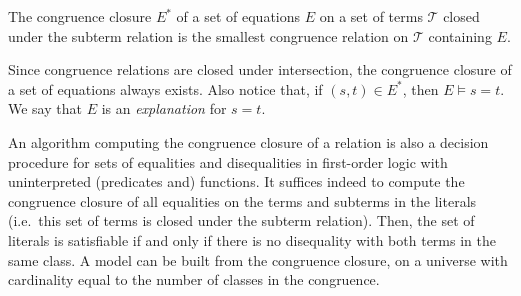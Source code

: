 \documentclass[smallextended]{svjour3}
\begin{document}
\begin{definition}
The congruence closure $E^*$ of a set of equations $E$ on a set of terms $\mathcal{T}$ closed under the subterm relation is the smallest congruence relation on $\mathcal{T}$ containing $E$.

\end{definition}
\noindent
Since congruence relations are closed under intersection, the congruence closure of a set of equations always exists.  Also notice that, if  $(s,t) \in E^*$, then $E \models s = t$.  We say that $E$ is an \emph{explanation} for $s = t$.

An algorithm computing the congruence closure of a relation is also a decision procedure for sets of equalities and disequalities in first-order logic with uninterpreted (predicates and) functions.  It suffices indeed to compute the congruence closure of all equalities on the terms and subterms in the literals  (i.e.\ this set of terms is closed under the subterm relation).  Then, the set of literals is satisfiable if and only if there is no disequality with both terms in the same class.  A model can be built from the congruence closure, on a universe with cardinality equal to the number of classes in the congruence.

%
%
%
%
%
\end{document}
